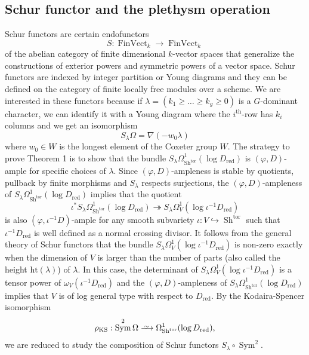 \documentclass[11pt]{amsart}
\numberwithin{subsection}{section}
\numberwithin{figure}{section}
\numberwithin{table}{section}
\theoremstyle{1}
\theoremstyle{2}
\DeclareMathOperator{\FinVect}{FinVect}
\DeclareMathOperator{\Sh}{Sh}
\DeclareMathOperator{\Sym}{Sym}
\DeclareMathOperator{\tor}{tor}
\DeclareMathOperator{\red}{red}
\newcommand{\DistTo}{\xrightarrow{
   \,\smash{\raisebox{-0.65ex}{\ensuremath{\scriptstyle\sim}}}\,}}
\begin{document}
\subsection{Schur functor and the plethysm operation}
Schur functors are certain endofunctors 
\begin{equation*}
S : \FinVect_{k} \rightarrow \FinVect_{k}
\end{equation*}
of the abelian category of finite dimensional $k$-vector spaces that generalize the constructions of exterior powers and symmetric powers of a vector space. Schur functors are indexed by integer partition or Young diagrams and they can be defined on the category of finite locally free modules over a scheme. We are interested in these functors because if $\lambda = (k_1 \geq \ldots \geq k_g \geq 0)$ is a $G$-dominant character, we can identify it with a Young diagram where the $i^{\text{th}}$-row has $k_i$ columns and we get an isomorphism 
\begin{equation*}
S_{\lambda}\Omega =  \nabla(-w_0\lambda)
\end{equation*}
where $w_0 \in W$ is the longest element of the Coxeter group $W$. The strategy to prove Theorem 1 is to show that the bundle $S_{\lambda}\Omega^1_{\Sh^{\tor}}(\log D_{\red})$ is $(\varphi,D)$-ample for specific choices of $\lambda$. Since $(\varphi,D)$-ampleness is stable by quotients, pullback by finite morphisms and $S_{\lambda}$ respects surjections, the $(\varphi,D)$-ampleness of $S_{\lambda}\Omega^1_{\Sh^{\tor}}(\log D_{\red})$ implies that the quotient 
\begin{equation*}
\iota^*S_{\lambda}\Omega^1_{\Sh^{\tor}}(\log D_{\red}) \twoheadrightarrow S_{\lambda}\Omega^1_V(\log \iota^{-1}D_{\red})
\end{equation*}
is also $(\varphi,\iota^{-1}D)$-ample for any smooth subvariety $\iota : V \hookrightarrow \Sh^{\tor}$ such that $\iota^{-1}D_{\red}$ is well defined as a normal crossing divisor. It follows from the general theory of Schur functors that the bundle $S_{\lambda}\Omega^1_V(\log \iota^{-1}D_{\red})$ is non-zero exactly when the dimension of $V$ is larger than the number of parts (also called the height $\text{ht}(\lambda)$) of $\lambda$. In this case, the determinant of $S_{\lambda}\Omega^1_V(\log \iota^{-1}D_{\red})$ is a tensor power of $\omega_{V}(\iota^{-1}D_{\red})$ and the $(\varphi,D)$-ampleness of $S_{\lambda}\Omega^1_{\Sh^{\tor}}(\log D_{\red})$ implies that $V$ is of log general type with respect to $D_{\red}$. By the Kodaira-Spencer isomorphism
\begin{equation*}
\rho_{\text{KS}} : \Sym^2 \Omega \DistTo \Omega^1_{\Sh^{\tor}}(\log D_{\red}),
\end{equation*}
we are reduced to study the composition of Schur functors $S_{\lambda} \circ \Sym^2$. \\
\end{document}
